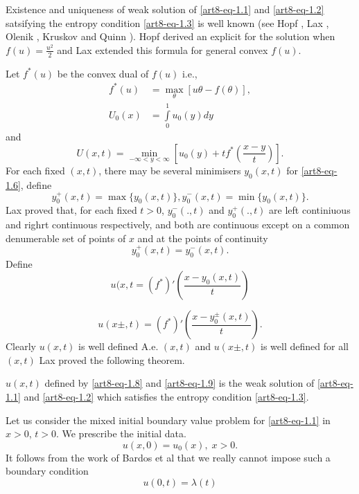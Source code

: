 Existence and uniqueness of weak solution of \eqref{art8-eq-1.1} and \eqref{art8-eq-1.2} satsifying the entropy condition \eqref{art8-eq-1.3} is well known (see Hopf \cite{art8-key2}, Lax \cite{art8-key9}, Olenik \cite{art8-key14}, Kruskov \cite{art8-key7} and Quinn \cite{art8-key13}). Hopf \cite{art8-key2} derived an explicit for the solution when $f(u) = \frac{u^{2}}{2}$ and Lax \cite{art8-key9} extended this formula for general convex $f(u)$.

Let $f^{*}(u)$ be the convex dual of $f(u)$ i.e.,
\begin{align}
f^{*}(u) &= \max\limits_{\theta}[u\theta - f(\theta)],\label{art8-eq-1.4}\\
U_{0}(x)&= \int\limits_{0}^{1} u_{0}(y)dy \label{art8-eq-1.5}
\end{align}
and
\begin{equation}\label{art8-eq-1.6}
U(x, t) = \min\limits_{-\infty < y < \infty}\left[u_{0}(y) + tf^{*}\left(\dfrac{x-y}{t}\right) \right].
\end{equation}
For each fixed $(x, t)$, there may be several minimisers $y_{0}(x,t)$ for \eqref{art8-eq-1.6}, define
\begin{equation}\label{art8-eq-1.7}
y_{0}^{+}(x,t)=\max\{y_{0}(x,t)\},y_{0}^{-}(x,t)= \min\{y_{0}(x,t)\}. 
\end{equation}
Lax \cite{art8-key9} proved that, for each fixed $t > 0$, $y_{0}^{-}(.,t)$ and $y_{0}^{+}(., t)$ are left continiuous and righrt continuous respectively, and both are continuous except on a common denumerable set of points of $x$ and at the points of continuity
$$
y_{0}^{+}(x,t) =y_{0}^{-}(x,t).
$$
Define
\begin{equation}\label{art8-eq-1.8}
u(x,t  =(f^{*})'\left(\dfrac{x-y_{0}(x,t)}{t}\right)
\end{equation}

\begin{equation}\label{art8-eq-1.9}
u(x \pm, t) = (f^{*})' \left(\dfrac{x-y_{0}^{\pm}(x,t)}{t}\right).
\end{equation}
Clearly $u(x,t)$ is well defined A.e. $(x,t)$ and $u(x \pm, t)$ is well defined for all $(x, t)$ Lax \cite{art8-key9} proved the following theorem.

\begin{theorem}\label{art8-thm-1}
$u(x,t)$ defined by \eqref{art8-eq-1.8} and \eqref{art8-eq-1.9} is the weak solution of \eqref{art8-eq-1.1} and
\eqref{art8-eq-1.2} which satisfies the entropy condition \eqref{art8-eq-1.3}. 
\end{theorem}

Let us consider the mixed initial boundary value problem for \eqref{art8-eq-1.1} in $x >0$, $t > 0$. We prescribe the initial data.
\begin{equation}\label{art8-eq-1.10}
u(x, 0) = u_{0}(x), \; x > 0.
\end{equation}
It follows from the work of Bardos et al \cite{art8-key1} that we really cannot impose such a boundary condition
\begin{equation}\label{art8-eq-1.11}
u(0,t)= \lambda(t)
\end{equation}
